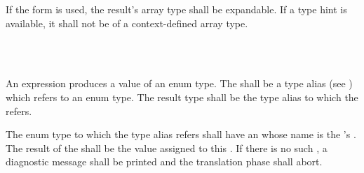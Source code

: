 \specsubsubitem
If the  form is used, the result's array type shall be expandable.
If a type hint is available, it shall not be of a context-defined array type.


\begin{grammar}
 \exactly \\
	 \terminal{::}  \\
\end{grammar}

\specsubsubitem
An  expression produces a value of an enum type. The
 shall be a type alias (see )
which refers to an enum type. The result type shall be the type alias to which
the  refers.

\specsubsubitem
The enum type to which the type alias refers shall have an
 whose name is the 's
. The result of the 
shall be the value assigned to this . If there is no
such , a diagnostic message shall be printed and the
translation phase shall abort. 


\begin{grammar}
 \\
	 \terminal{\{}  \optional{\terminal{,}} \terminal{\}} \\
	 \terminal{\{}  \optional{\terminal{,}} \terminal{\}} \\

 \\
	 \\
	 \terminal{,}  \\
	 \\

 \\
	 \\
	 \terminal{,}  \\

 \\
	 \terminal{=}  \\
	 \terminal{:}  \terminal{=}  \\
	 \\
\end{grammar}

